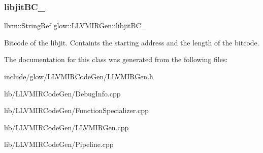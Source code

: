 \subsubsection{\texorpdfstring{libjit\+B\+C\+\_\+}{libjitBC\_}}
{\footnotesize\ttfamily llvm\+::\+String\+Ref glow\+::\+L\+L\+V\+M\+I\+R\+Gen\+::libjit\+B\+C\+\_\+\hspace{0.3cm}{\ttfamily [protected]}}

Bitcode of the libjit. Containts the starting address and the length of the bitcode. 

The documentation for this class was generated from the following files\+:\begin{DoxyCompactItemize}
\item 
include/glow/\+L\+L\+V\+M\+I\+R\+Code\+Gen/L\+L\+V\+M\+I\+R\+Gen.\+h\item 
lib/\+L\+L\+V\+M\+I\+R\+Code\+Gen/Debug\+Info.\+cpp\item 
lib/\+L\+L\+V\+M\+I\+R\+Code\+Gen/Function\+Specializer.\+cpp\item 
lib/\+L\+L\+V\+M\+I\+R\+Code\+Gen/L\+L\+V\+M\+I\+R\+Gen.\+cpp\item 
lib/\+L\+L\+V\+M\+I\+R\+Code\+Gen/Pipeline.\+cpp\end{DoxyCompactItemize}
